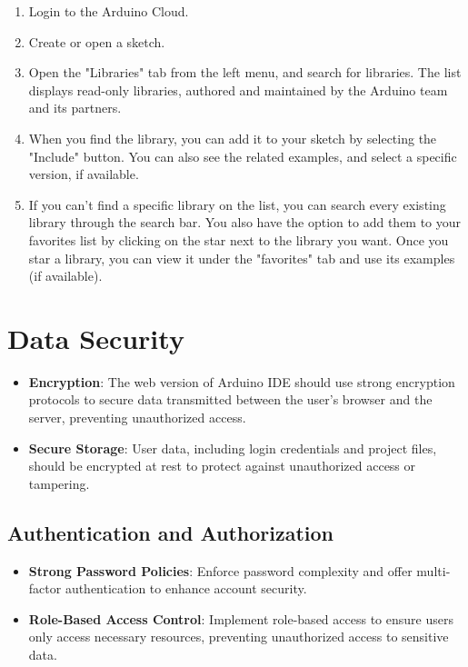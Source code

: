 \begin{enumerate}
	\item Login to the Arduino Cloud.
	\item Create or open a sketch.
	\item Open the "Libraries" tab from the left menu, and search for libraries. The list displays read-only libraries, authored and maintained by the Arduino team and its partners.
	\item When you find the library, you can add it to your sketch by selecting the "Include" button. You can also see the related examples, and select a specific version, if available.
	\item If you can't find a specific library on the list, you can search every existing library through the search bar. You also have the option to add them to your favorites list by clicking on the star next to the library you want. Once you star a library, you can view it under the "favorites" tab and use its examples (if available).
\end{enumerate} 

\section{Data Security}
\begin{itemize}
	\item \textbf{Encryption}: The web version of Arduino IDE should use strong encryption protocols to secure data transmitted between the user's browser and the server, preventing unauthorized access.
	\item \textbf{Secure Storage}: User data, including login credentials and project files, should be encrypted at rest to protect against unauthorized access or tampering.
\end{itemize}

\subsection{Authentication and Authorization}
\begin{itemize}
	\item \textbf{Strong Password Policies}: Enforce password complexity and offer multi-factor authentication to enhance account security.
	\item \textbf{Role-Based Access Control}: Implement role-based access to ensure users only access necessary resources, preventing unauthorized access to sensitive data.
\end{itemize}

